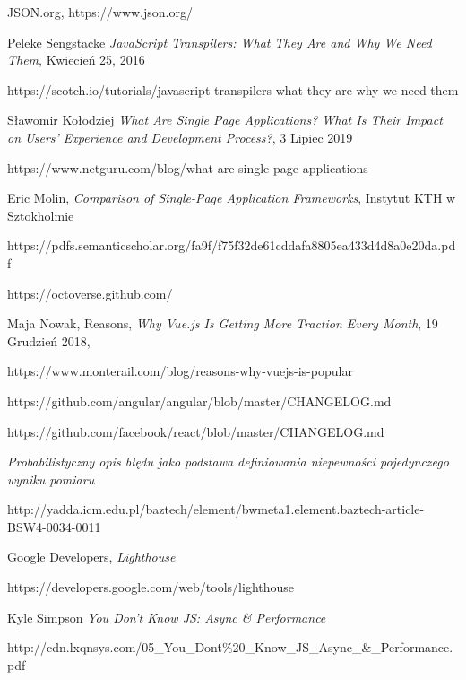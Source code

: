 \cleardoublepage
{}
{}


\begin{thebibliography}{99}

 JSON.org, https://www.json.org/

Peleke Sengstacke
\textit{JavaScript Transpilers: What They Are and Why We Need Them},
Kwiecień 25, 2016

https://scotch.io/tutorials/javascript-transpilers-what-they-are-why-we-need-them

Sławomir Kołodziej
\textit{What Are Single Page Applications? What Is Their Impact on Users’ Experience and Development Process?},
3 Lipiec 2019

https://www.netguru.com/blog/what-are-single-page-applications

Eric Molin, 
\textit{Comparison of Single-Page Application Frameworks},
Instytut KTH w  Sztokholmie

https://pdfs.semanticscholar.org/fa9f/f75f32de61cddafa8805ea433d4d8a0e20da.pdf

https://octoverse.github.com/

Maja Nowak, Reasons,
\textit{Why Vue.js Is Getting More Traction Every Month},
19 Grudzień 2018, 

https://www.monterail.com/blog/reasons-why-vuejs-is-popular


https://github.com/angular/angular/blob/master/CHANGELOG.md

 
https://github.com/facebook/react/blob/master/CHANGELOG.md

\textit{Probabilistyczny opis błędu jako podstawa definiowania niepewności pojedynczego wyniku pomiaru}

http://yadda.icm.edu.pl/baztech/element/bwmeta1.element.baztech-article-BSW4-0034-0011

Google Developers,
\textit{Lighthouse}

https://developers.google.com/web/tools/lighthouse

Kyle Simpson
\textit{You Don't Know JS: Async \& Performance}

http://cdn.lxqnsys.com/05\_You\_Don\'t\%20\_Know\_JS\_Async\_\&\_Performance.pdf


\end{thebibliography}
